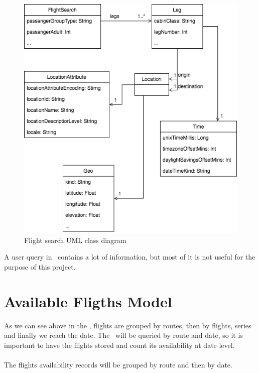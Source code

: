 \begin{figure}[H]
\centering
\includegraphics[scale=0.6]{diagrams/flight_search.png}
\caption{Flight search UML class diagram}
\end{figure}

A user query in \company\ contains a lot of information, but most of it is not useful for the purpose of this project.


\section{Available Fligths Model} \label{flight-availablity-model}

As we can see above in the , flights are grouped by routes, then by flights, series and finally we reach the date. The \thesis\ will be queried by route and date, so it is important to have the flights stored and count its availability at date level.
\\\\
The flights availability records will be grouped by route and then by date.

